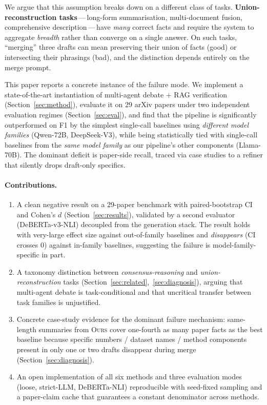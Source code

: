 \documentclass[11pt,a4paper]{article}
\begin{document}
We argue that this assumption breaks down on a different class of
tasks. \textbf{Union-reconstruction tasks}\,---\,long-form summarisation,
multi-document fusion, comprehensive description\,---\,have
\emph{many} correct facts and require the system to aggregate
\emph{breadth} rather than converge on a single answer. On such
tasks, ``merging'' three drafts can mean preserving their union of
facts (good) or intersecting their phrasings (bad), and the
distinction depends entirely on the merge prompt.

This paper reports a concrete instance of the failure mode. We
implement a state-of-the-art instantiation of multi-agent debate +
RAG verification (Section~\ref{sec:method}), evaluate it on 29 arXiv
papers under two independent evaluation regimes (Section~\ref{sec:eval}),
and find that the pipeline is significantly outperformed on F1 by the
simplest single-call baselines using \emph{different model families}
(Qwen-72B, DeepSeek-V3), while being statistically tied with
single-call baselines from the \emph{same model family} as our
pipeline's other components (Llama-70B). The dominant deficit is
paper-side recall, traced via case studies to a refiner that
silently drops draft-only specifics.

\paragraph{Contributions.}
\begin{enumerate}[leftmargin=*,topsep=2pt,itemsep=1pt]
    \item A clean negative result on a 29-paper benchmark with
          paired-bootstrap CI and Cohen's $d$
          (Section~\ref{sec:results}), validated by a second
          evaluator (DeBERTa-v3-NLI) decoupled from the generation
          stack. The result holds with very-large effect size against
          out-of-family baselines and \emph{disappears} (CI crosses 0)
          against in-family baselines, suggesting the failure is
          model-family-specific in part.
    \item A taxonomy distinction between \emph{consensus-reasoning}
          and \emph{union-reconstruction} tasks
          (Section~\ref{sec:related},~\ref{sec:diagnosis}), arguing
          that multi-agent debate is task-conditional and that
          uncritical transfer between task families is unjustified.
    \item Concrete case-study evidence for the dominant failure
          mechanism: same-length summaries from \textsc{Ours} cover
          one-fourth as many paper facts as the best baseline because
          specific numbers / dataset names / method components present
          in only one or two drafts disappear during merge
          (Section~\ref{sec:diagnosis}).
    \item An open implementation of all six methods and three
          evaluation modes (loose, strict-LLM, DeBERTa-NLI) reproducible
          with seed-fixed sampling and a paper-claim cache that
          guarantees a constant denominator across methods.
\end{enumerate}
\end{document}
